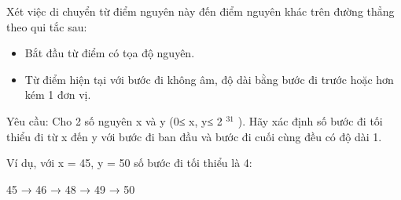 Xét việc di chuyển từ điểm nguyên này đến điểm nguyên khác trên đường thẳng theo qui tắc sau:  
\begin{itemize}
	\item     Bắt đầu từ điểm có tọa độ nguyên.   
	\item     Từ điểm hiện tại với bước đi không âm, độ dài bằng bước đi trước hoặc hơn kém 1 đơn vị.   
\end{itemize}

   Yêu cầu: Cho 2 số nguyên x và y (0≤ x, y≤ 2   $^    31   $   ). Hãy xác định số bước đi tối thiểu đi từ x đến y với   bước đi ban đầu và bước đi cuối cùng đều có độ dài 1.  

   Ví dụ, với x = 45, y = 50 số bước đi tối thiểu là 4:  

   45 → 46 → 48 → 49 → 50  

\